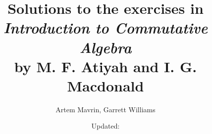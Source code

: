 \usepackage{defs}

\title{\texorpdfstring{%
Solutions to the exercises in\\
\emph{Introduction to Commutative Algebra}\\
by M. F. Atiyah and I. G. Macdonald}%
{Atiyah-Macdonald Solutions}}
\author{Artem Mavrin, Garrett Williams}
\date{\small Updated: \texttt{\DTMNow}}


